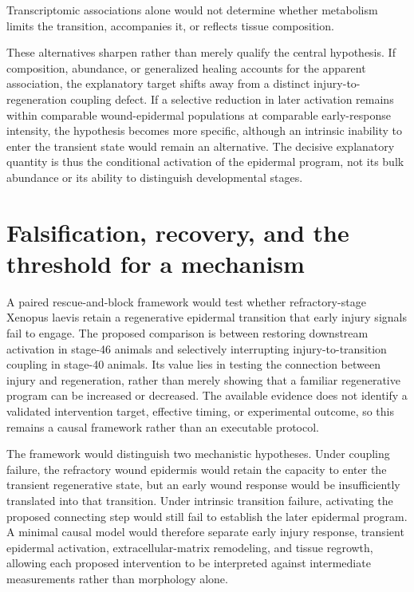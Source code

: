 \documentclass[11pt]{article}
\begin{document}
Transcriptomic associations alone would not determine whether metabolism limits the transition, accompanies it, or reflects tissue composition.

These alternatives sharpen rather than merely qualify the central hypothesis. If composition, abundance, or generalized healing accounts for the apparent association, the explanatory target shifts away from a distinct injury-to-regeneration coupling defect. If a selective reduction in later activation remains within comparable wound-epidermal populations at comparable early-response intensity, the hypothesis becomes more specific, although an intrinsic inability to enter the transient state would remain an alternative. The decisive explanatory quantity is thus the conditional activation of the epidermal program, not its bulk abundance or its ability to distinguish developmental stages.

\section{Falsification, recovery, and the threshold for a mechanism}
A paired rescue-and-block framework would test whether refractory-stage Xenopus laevis retain a regenerative epidermal transition that early injury signals fail to engage. The proposed comparison is between restoring downstream activation in stage-46 animals and selectively interrupting injury-to-transition coupling in stage-40 animals. Its value lies in testing the connection between injury and regeneration, rather than merely showing that a familiar regenerative program can be increased or decreased. The available evidence does not identify a validated intervention target, effective timing, or experimental outcome, so this remains a causal framework rather than an executable protocol.

The framework would distinguish two mechanistic hypotheses. Under coupling failure, the refractory wound epidermis would retain the capacity to enter the transient regenerative state, but an early wound response would be insufficiently translated into that transition. Under intrinsic transition failure, activating the proposed connecting step would still fail to establish the later epidermal program. A minimal causal model would therefore separate early injury response, transient epidermal activation, extracellular-matrix remodeling, and tissue regrowth, allowing each proposed intervention to be interpreted against intermediate measurements rather than morphology alone.
\end{document}

